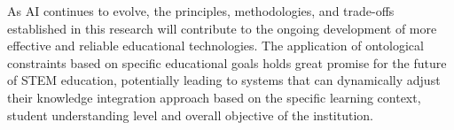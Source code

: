 As AI continues to evolve, the principles, methodologies, and trade-offs established in this research will contribute to the ongoing development of more effective and reliable educational technologies. The application of ontological constraints based on specific educational goals holds great promise for the future of STEM education, potentially leading to systems that can dynamically adjust their knowledge integration approach based on the specific learning context, student understanding level and overall objective of the institution.